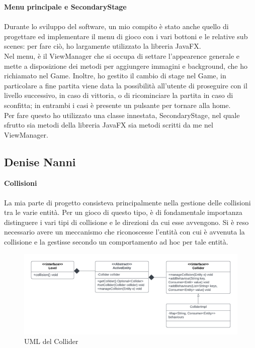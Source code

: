 \documentclass[a4paper,12pt]{report}
\begin{document}
\newpage
\textbf{Menu principale e SecondaryStage}\\
\\
Durante lo sviluppo del software, un mio compito è stato anche quello di progettare ed implementare il menu di gioco con i vari bottoni e le relative sub scenes: per fare ciò, ho largamente utilizzato la libreria JavaFX.\\
Nel menu, è il ViewManager che si occupa di settare l'appearence generale e mette a disposizione dei metodi per aggiungere immagini e background, che ho richiamato nel Game.
Inoltre, ho gestito il cambio di stage nel Game, in particolare a fine partita viene data la possibilità all'utente di proseguire con il livello successivo, in caso di vittoria, o di ricominciare la partita in caso di sconfitta; in entrambi i casi è presente un pulsante per tornare alla home.\\
Per fare questo ho utilizzato una classe innestata, SecondaryStage, nel quale sfrutto sia metodi della libreria JavaFX sia metodi scritti da me nel ViewManager.

\subsection{Denise Nanni}
\textbf{Collisioni}\\
\\
La mia parte di progetto consisteva principalmente nella gestione delle collisioni tra le varie entità.
Per un gioco di questo tipo, è di fondamentale importanza distinguere i vari tipi di collisione e le direzioni da cui esse avvengono. Si è reso necessario avere un meccanismo che riconoscesse l'entità con cui è avvenuta la collisione e la gestisse secondo un comportamento ad hoc per tale entità.

\begin{figure}[ht]
\includegraphics[width=1\textwidth]{umlCollider.png}
\caption{UML del Collider}
\label{fig:schgen}
\end{figure}
\end{document}
